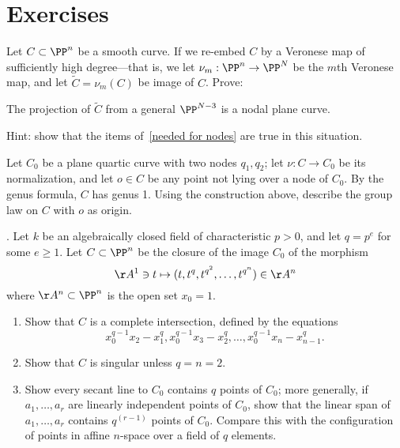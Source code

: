 \section{Exercises}

\begin{exercise}
Let $C\subset \PP^n$ be a smooth curve. If we re-embed $C$ by a Veronese map of sufficiently high degree---that is, we let $\nu_m : \PP^n \to \PP^N$ be the $m$th Veronese map, and let $\widetilde C = \nu_m(C)$ be image of $C$. Prove:

\begin{proposition}\label{positive characteristic nodes}
The projection of $\widetilde C$ from a general $\PP^{N-3}$ is a nodal plane curve.
\end{proposition}

Hint: show that the items of~\ref{needed for nodes}  are true in this situation.
\end{exercise}

\begin{exercise}
Let $C_0$ be a plane quartic curve with two nodes $q_1, q_2$; let $\nu : C \to C_0$ be its normalization, and let $o \in C$ be any point not lying over a node of $C_0$.
By the genus formula, $C$ has genus 1. Using the construction above, describe the group law on $C$ with $o$ as origin.
\end{exercise}

\begin{exercise}\label{strange curves} \cite{Rathmann}. Let $k$ be an algebraically closed field of characteristic $p>0$, and let $q=p^e$ for some $e\geq 1$. Let $C\subset \PP^n$
be the closure of the image $C_0$ of the morphism
$$
\AA^1 \ni t \mapsto (t, t^q, t^{q^2}, \dots , t^{q^{n}}) \in \AA^n
$$
where $\AA^n\subset \PP^n$ is the open set $x_0=1$. 
\begin{enumerate}
\item Show that $C$ is a complete intersection, defined by the equations
$$
x_0^{q-1}x_2 - x_1^q, x_0^{q-1}x_3 - x_2^q,\dots, 
x_0^{q-1}x_n - x_{n-1}^q.
$$
\item Show that $C$ is singular unless $q = n = 2$.
\item Show every secant line to $C_0$ contains $q$ points of $C_0$; more generally, if
$a_1, \dots, a_r$ are linearly independent points of $C_0$, show that the linear span of
$a_1, \dots, a_r$ contains $q^{(r-1)}$ points of $C_0$.  Compare this with the configuration of
points in affine $n$-space over a field of $q$ elements.
\end{enumerate}
\end{exercise}

